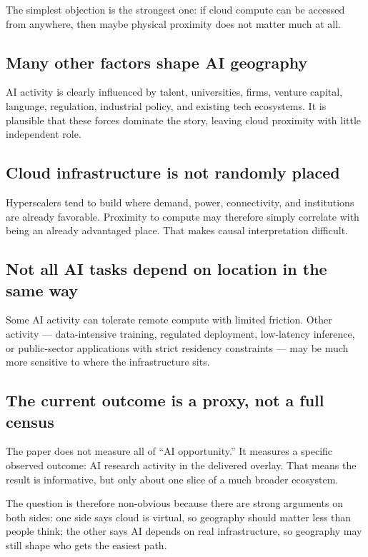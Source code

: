 \documentclass[11pt]{article}
\begin{document}
The simplest objection is the strongest one: if cloud compute can be accessed from anywhere, then maybe physical proximity does not matter much at all.

\subsection{Many other factors shape AI geography}

AI activity is clearly influenced by talent, universities, firms, venture capital, language, regulation, industrial policy, and existing tech ecosystems. It is plausible that these forces dominate the story, leaving cloud proximity with little independent role.

\subsection{Cloud infrastructure is not randomly placed}

Hyperscalers tend to build where demand, power, connectivity, and institutions are already favorable. Proximity to compute may therefore simply correlate with being an already advantaged place. That makes causal interpretation difficult.

\subsection{Not all AI tasks depend on location in the same way}

Some AI activity can tolerate remote compute with limited friction. Other activity --- data-intensive training, regulated deployment, low-latency inference, or public-sector applications with strict residency constraints --- may be much more sensitive to where the infrastructure sits.

\subsection{The current outcome is a proxy, not a full census}

The paper does not measure all of ``AI opportunity.'' It measures a specific observed outcome: AI research activity in the delivered overlay. That means the result is informative, but only about one slice of a much broader ecosystem.

The question is therefore non-obvious because there are strong arguments on both sides: one side says cloud is virtual, so geography should matter less than people think; the other says AI depends on real infrastructure, so geography may still shape who gets the easiest path.
\end{document}
